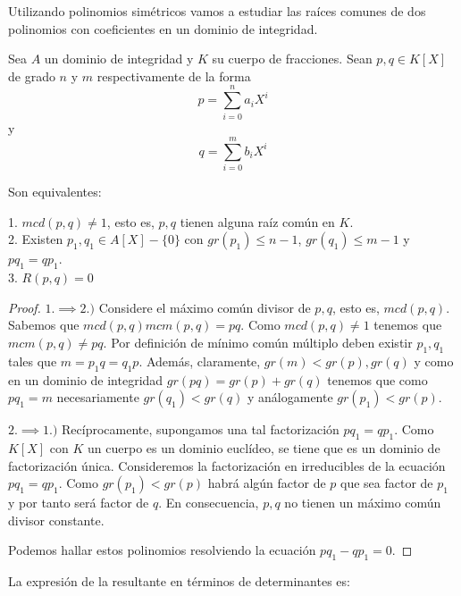 Utilizando polinomios simétricos vamos a estudiar las raíces comunes de dos polinomios con coeficientes en un dominio de integridad. 

Sea $A$ un dominio de integridad y $K$ su cuerpo de fracciones. Sean $p,q \in K[X]$ de grado $n$ y $m$ respectivamente de la forma $$p = \sum_{i = 0}^n a_iX^i$$ y $$q = \sum_{i = 0}^m b_iX^i$$ 

\begin{proposition}
Son equivalentes:

1. $mcd(p,q) \neq 1$, esto es, $p,q$ tienen alguna raíz común en $K$.\\
2. Existen $p_1,q_1 \in A[X] - \{0\}$ con $gr(p_1) \le n-1$, $gr(q_1) \le m-1$ y $pq_1 = qp_1$. \\
3. $R(p,q) = 0$
\end{proposition}
\begin{proof}
$1. \implies 2.)$ Considere el máximo común divisor de $p,q$, esto es, $mcd(p,q)$. Sabemos que $mcd(p,q)mcm(p,q) = pq$. Como $mcd(p,q) \neq 1$ tenemos que $mcm(p,q) \neq pq$. Por definición de mínimo común múltiplo deben existir $p_1,q_1$ tales que $m = p_1q = q_1p$. Además, claramente, $gr(m) < gr(p),gr(q)$ y como en un dominio de integridad $gr(pq) = gr(p) + gr(q)$ tenemos que como $pq_1 = m$ necesariamente $gr(q_1) < gr(q)$ y análogamente $gr(p_1) < gr(p)$. 

$2. \implies 1.)$ Recíprocamente, supongamos una tal factorización $pq_1 = qp_1$. Como $K[X]$ con $K$ un cuerpo es un dominio euclídeo, se tiene que es un dominio de factorización única. Consideremos la factorización en irreducibles de la ecuación $pq_1 = qp_1$. Como $gr(p_1) < gr(p)$ habrá algún factor de $p$ que sea factor de $p_1$ y por tanto será factor de $q$. En consecuencia, $p,q$ no tienen un máximo común divisor constante. 

Podemos hallar estos polinomios resolviendo la ecuación $pq_1-qp_1 = 0$. 
\end{proof}

La expresión de la resultante en términos de determinantes es:


